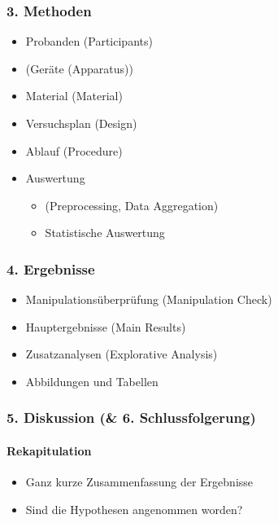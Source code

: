 \documentclass[
]{book}
\providecommand{\tightlist}{%
  \setlength{\itemsep}{0pt}\setlength{\parskip}{0pt}}
\begin{document}
\hypertarget{methoden}{%
\subsubsection{3. Methoden}\label{methoden}}

\begin{itemize}
\item
  Probanden (Participants)
\item
  (Geräte (Apparatus))
\item
  Material (Material)
\item
  Versuchsplan (Design)
\item
  Ablauf (Procedure)
\item
  Auswertung

  \begin{itemize}
  \item
    (Preprocessing, Data Aggregation)
  \item
    Statistische Auswertung
  \end{itemize}
\end{itemize}

\hypertarget{ergebnisse}{%
\subsubsection{4. Ergebnisse}\label{ergebnisse}}

\begin{itemize}
\item
  Manipulationsüberprüfung (Manipulation Check)
\item
  Hauptergebnisse (Main Results)
\item
  Zusatzanalysen (Explorative Analysis)
\item
  Abbildungen und Tabellen
\end{itemize}

\hypertarget{diskussion-6.-schlussfolgerung}{%
\subsubsection{5. Diskussion (\& 6. Schlussfolgerung)}\label{diskussion-6.-schlussfolgerung}}

\hypertarget{rekapitulation}{%
\paragraph{Rekapitulation}\label{rekapitulation}}

\begin{itemize}
\tightlist
\item
  Ganz kurze Zusammenfassung der Ergebnisse
\item
  Sind die Hypothesen angenommen worden?
\end{itemize}
\end{document}
